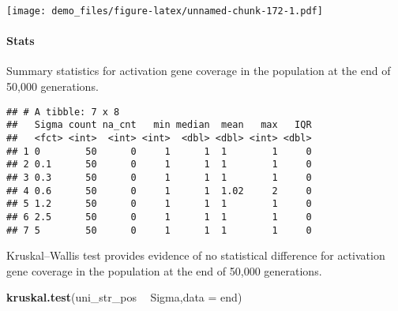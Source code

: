\documentclass[]{book}
\newenvironment{Shaded}{\begin{snugshade}}{\end{snugshade}}
\newcommand{\DataTypeTok}[1]{\textcolor[rgb]{0.13,0.29,0.53}{#1}}
\newcommand{\KeywordTok}[1]{\textcolor[rgb]{0.13,0.29,0.53}{\textbf{#1}}}
\newcommand{\NormalTok}[1]{#1}
\newcommand{\OperatorTok}[1]{\textcolor[rgb]{0.81,0.36,0.00}{\textbf{#1}}}
\newcommand{\OtherTok}[1]{\textcolor[rgb]{0.56,0.35,0.01}{#1}}
\newcommand{\StringTok}[1]{\textcolor[rgb]{0.31,0.60,0.02}{#1}}
\let\oldparagraph\paragraph
\renewcommand{\paragraph}[1]{\oldparagraph{#1}\mbox{}}
\begin{document}
\texttt{[image: demo\_files/figure-latex/unnamed-chunk-172-1.pdf]}

\hypertarget{stats-33}{%
\paragraph{Stats}\label{stats-33}}

Summary statistics for activation gene coverage in the population at the end of 50,000 generations.

\begin{Shaded}
\end{Shaded}

\begin{verbatim}
## # A tibble: 7 x 8
##   Sigma count na_cnt   min median  mean   max   IQR
##   <fct> <int>  <int> <int>  <dbl> <dbl> <int> <dbl>
## 1 0        50      0     1      1  1        1     0
## 2 0.1      50      0     1      1  1        1     0
## 3 0.3      50      0     1      1  1        1     0
## 4 0.6      50      0     1      1  1.02     2     0
## 5 1.2      50      0     1      1  1        1     0
## 6 2.5      50      0     1      1  1        1     0
## 7 5        50      0     1      1  1        1     0
\end{verbatim}

Kruskal--Wallis test provides evidence of no statistical difference for activation gene coverage in the population at the end of 50,000 generations.

\begin{Shaded}
\begin{Highlighting}[]
\KeywordTok{kruskal.test}\NormalTok{(uni_str_pos }\OperatorTok{~}\StringTok{ }\NormalTok{Sigma,}\DataTypeTok{data =}\NormalTok{ end)}
\end{Highlighting}
\end{Shaded}
\end{document}
